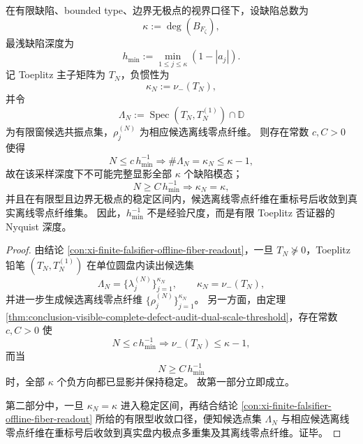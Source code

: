 \begin{theorem}\label{thm:conclusion-finite-toeplitz-falsifier-nyquist-depth-barrier}
在有限缺陷、bounded type、边界无极点的视界口径下，设缺陷总数为
\[
\kappa:=\deg(B_{F_\zeta}),
\]
最浅缺陷深度为
\[
h_{\min}:=\min_{1\le j\le \kappa}(1-|a_j|).
\]
记 Toeplitz 主子矩阵为 \(T_N\)，负惯性为
\[
\kappa_N:=\nu_-(T_N),
\]
并令
\[
\Lambda_N:=\operatorname{Spec}(T_N,T_N^{(1)})\cap\mathbb D
\]
为有限窗候选共振点集，\(\rho_j^{(N)}\) 为相应候选离线零点纤维。
则存在常数 \(c,C>0\) 使得
\[
N\le c\,h_{\min}^{-1}
\Longrightarrow
\#\Lambda_N=\kappa_N\le \kappa-1,
\]
故在该采样深度下不可能完整显影全部 \(\kappa\) 个缺陷模态；
\[
N\ge C\,h_{\min}^{-1}
\Longrightarrow
\kappa_N=\kappa,
\]
并且在有限型且边界无极点的稳定区间内，候选离线零点纤维在重标号后收敛到真实离线零点纤维集。
因此，\(h_{\min}^{-1}\) 不是经验尺度，而是有限 Toeplitz 否证器的 Nyquist 深度。
\end{theorem}
\begin{proof}
由结论 \ref{con:xi-finite-falsifier-offline-fiber-readout}，一旦 \(T_N\nsucceq 0\)，Toeplitz 铅笔 \((T_N,T_N^{(1)})\) 在单位圆盘内读出候选集
\[
\Lambda_N=\{\lambda_j^{(N)}\}_{j=1}^{\kappa_N},
\qquad
\kappa_N=\nu_-(T_N),
\]
并进一步生成候选离线零点纤维 \(\{\rho_j^{(N)}\}_{j=1}^{\kappa_N}\)。
另一方面，由定理 \ref{thm:conclusion-visible-complete-defect-audit-dual-scale-threshold}，存在常数 \(c,C>0\) 使
\[
N\le c\,h_{\min}^{-1}
\Longrightarrow
\nu_-(T_N)\le \kappa-1,
\]
而当
\[
N\ge C\,h_{\min}^{-1}
\]
时，全部 \(\kappa\) 个负方向都已显影并保持稳定。
故第一部分立即成立。

第二部分中，一旦 \(\kappa_N=\kappa\) 进入稳定区间，再结合结论 \ref{con:xi-finite-falsifier-offline-fiber-readout} 所给的有限型收敛口径，便知候选点集 \(\Lambda_N\) 与相应候选离线零点纤维在重标号后收敛到真实盘内极点多重集及其离线零点纤维。证毕。
\end{proof}

